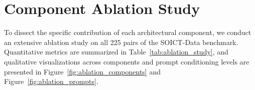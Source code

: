\section{Component Ablation Study}
\label{sec:ablation}

To dissect the specific contribution of each architectural component, we conduct an extensive ablation study on all 225 pairs of the SOICT-Data benchmark. Quantitative metrics are summarized in Table~\ref{tab:ablation_study}, and qualitative visualizations across components and prompt conditioning levels are presented in Figure~\ref{fig:ablation_components} and Figure~\ref{fig:ablation_prompts}.


